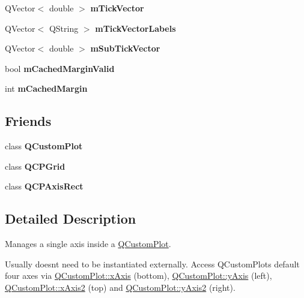 \begin{DoxyCompactItemize}
\item 
\mbox{\label{class_q_c_p_axis_aae0f9b9973b85be601200f00f5825087}} 
Q\+Vector$<$ double $>$ {\bfseries m\+Tick\+Vector}
\item 
\mbox{\label{class_q_c_p_axis_aeee4bd0fca3f587eafe33843d1cb4f82}} 
Q\+Vector$<$ Q\+String $>$ {\bfseries m\+Tick\+Vector\+Labels}
\item 
\mbox{\label{class_q_c_p_axis_a28353081e0ff35c3fe5ced923a287faa}} 
Q\+Vector$<$ double $>$ {\bfseries m\+Sub\+Tick\+Vector}
\item 
\mbox{\label{class_q_c_p_axis_a2cde37b6e385f47e11322df4ac1b0e9b}} 
bool {\bfseries m\+Cached\+Margin\+Valid}
\item 
\mbox{\label{class_q_c_p_axis_a48ace55cbd54f7241e7f1b06fd369b64}} 
int {\bfseries m\+Cached\+Margin}
\end{DoxyCompactItemize}
\subsection*{Friends}
\begin{DoxyCompactItemize}
\item 
\mbox{\label{class_q_c_p_axis_a1cdf9df76adcfae45261690aa0ca2198}} 
class {\bfseries Q\+Custom\+Plot}
\item 
\mbox{\label{class_q_c_p_axis_a061e177f585549fc31f780852e2bd6fe}} 
class {\bfseries Q\+C\+P\+Grid}
\item 
\mbox{\label{class_q_c_p_axis_acbf20ecb140f66c5fd1bc64ae0762990}} 
class {\bfseries Q\+C\+P\+Axis\+Rect}
\end{DoxyCompactItemize}


\subsection{Detailed Description}
Manages a single axis inside a \mbox{\hyperlink{class_q_custom_plot}{Q\+Custom\+Plot}}. 

Usually doesn\textquotesingle{}t need to be instantiated externally. Access Q\+Custom\+Plot\textquotesingle{}s default four axes via \mbox{\hyperlink{class_q_custom_plot_a9a79cd0158a4c7f30cbc702f0fd800e4}{Q\+Custom\+Plot\+::x\+Axis}} (bottom), \mbox{\hyperlink{class_q_custom_plot_af6fea5679725b152c14facd920b19367}{Q\+Custom\+Plot\+::y\+Axis}} (left), \mbox{\hyperlink{class_q_custom_plot_ada41599f22cad901c030f3dcbdd82fd9}{Q\+Custom\+Plot\+::x\+Axis2}} (top) and \mbox{\hyperlink{class_q_custom_plot_af13fdc5bce7d0fabd640f13ba805c0b7}{Q\+Custom\+Plot\+::y\+Axis2}} (right).

